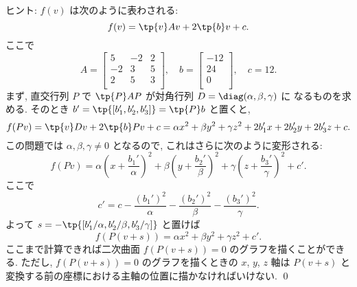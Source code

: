 \documentclass[12pt,twoside]{jarticle}
\begin{document}
\noindent
ヒント: $f(v)$ は次のように表わされる:
\begin{equation*}
  f(v) = \tp{v}Av + 2\tp{b}v + c.
\end{equation*}
ここで
\begin{equation*}
  A =
  \left[ 
    \begin{array}{rrr}
       5 & -2 & 2 \\
      -2 &  3 & 5 \\
       2 &  5 & 3 \\
    \end{array}
  \right],
  \quad
  b =
  \left[ 
    \begin{array}{r}
      -12 \\
       24 \\
        0 \\
    \end{array}
  \right],
  \quad
  c = 12.
\end{equation*}
まず, 直交行列 $P$ で $\tp{P}AP$ が対角行列 $D=\diag(\alpha,\beta,\gamma)$ に
なるものを求める. そのとき $b'=\tp{[b_1',b_2',b_3']}=\tp{P}b$ と置くと,
\begin{equation*}
  f(Pv) 
  = \tp{v}Dv + 2\tp{b}Pv + c
  = \alpha x^2 + \beta y^2 + \gamma z^2 
  + 2b_1'x + 2b_2'y + 2b_3'z + c.
\end{equation*}
この問題では $\alpha,\beta,\gamma\ne 0$ となるので, 
これはさらに次のように変形される:
\begin{equation*}
  f(Pv) 
  = \alpha\left(x + \frac{b_1'}{\alpha}\right)^2
  + \beta \left(y + \frac{b_2'}{\beta} \right)^2
  + \gamma\left(z + \frac{b_3'}{\gamma}\right)^2
  + c'.
\end{equation*}
ここで
\begin{equation*}
  c' = c 
  - \frac{(b_1')^2}{\alpha} 
  - \frac{(b_2')^2}{\beta} 
  - \frac{(b_3')^2}{\gamma}.
\end{equation*}
よって $s = -\tp{[b_1'/\alpha, b_2'/\beta, b_3'/\gamma]}$ と置けば
\begin{equation*}
  f(P(v+s)) = \alpha x^2 + \beta y^2 + \gamma z^2 + c'.
\end{equation*}
ここまで計算できれば二次曲面 $f(P(v+s))=0$ のグラフを描くことができる.
ただし, $f(P(v+s))=0$ のグラフを描くときの $x$, $y$, $z$ 軸は
$P(v+s)$ と変換する前の座標における主軸の位置に描かなければいけない.
\qed
\end{document}
